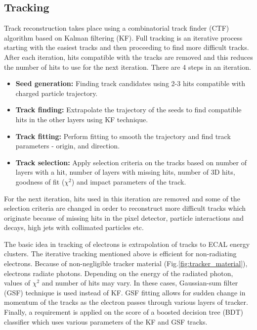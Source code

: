 \subsection{Tracking}
Track reconstruction takes place using a combinatorial track finder (CTF) algorithm based on Kalman filtering (KF). Full tracking is an 
iterative process starting with the easiest tracks and then proceeding to find more difficult tracks. After each iteration, hits 
compatible with the tracks are removed and this reduces the number of hits to use for the next iteration. There are 4 steps in an 
iteration.
\begin{itemize}
\item \textbf{Seed generation:} Finding track candidates using 2-3 hits compatible with charged particle trajectory.
\item \textbf{Track finding:} Extrapolate the trajectory of the seeds to find compatible hits in the other layers using KF technique.
\item \textbf{Track fitting:} Perform fitting to smooth the trajectory and find track parameters - origin, \pt and direction.
\item \textbf{Track selection:} Apply selection criteria on the tracks based on number of layers with a hit, number of layers with missing hits, number of 3D hits, goodness of fit ($\chi^2$) and impact parameters of the track.
\end{itemize}
For the next iteration, hits used in this iteration are removed and some of the selection criteria are changed in order to reconstruct 
more difficult tracks which originate because of missing hits in the pixel detector, particle interactions and decays, high \pt jets with 
collimated particles etc.

The basic idea in tracking of electrons is extrapolation of tracks to ECAL energy clusters. The iterative tracking mentioned above is 
efficient for non-radiating electrons. Because of non-negligible tracker material (Fig.\ref{fig:tracker_material}), electrons radiate 
photons. Depending on the energy of the radiated photon, values of $\chi^2$ and number of hits may vary. In these cases, Gaussian-sum 
filter (GSF) technique \cite{Adam_2005} is used instead of KF. GSF fitting allows for sudden change in momentum of the tracks as the 
electron passes through various layers of tracker. Finally, a requirement is applied on the score of a boosted decision tree (BDT) 
classifier which uses various parameters of the KF and GSF tracks.

